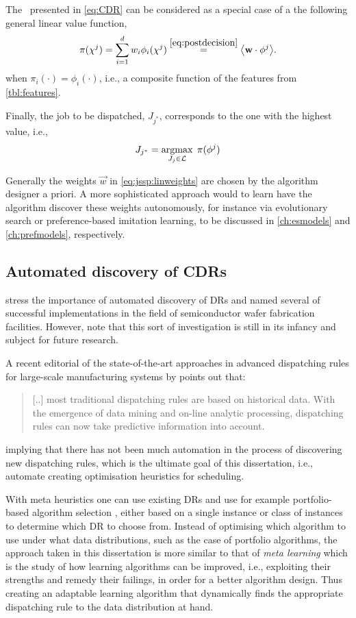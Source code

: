 The \cdr\ presented in \cref{eq:CDR} can be considered as a special case of a 
the following general linear value function,
\begin{equation}\label{eq:jssp:linweights}
    \pi(\vchi^j)=\sum_{i=1}^d w_i \phi_i(\vchi^j) 
    \stackrel{\eqref{eq:postdecision}}{=}
    \inner{\vec{w}}{\vphi^j}.
\end{equation}
when $\pi_i(\cdot)=\phi_i(\cdot)$, i.e., a composite function of the features 
from \cref{tbl:features}. 

Finally, the job to be dispatched, $J_{j^*}$, corresponds to the one with the 
highest value, i.e.,
\begin{equation}\label{eq:lin}
    J_{j^*}=\argmax_{J_j\in \mathcal{L}}\; \pi(\vphi^j)
\end{equation}

Generally the weights $\vec{w}$ in \cref{eq:jssp:linweights} are chosen by the 
algorithm designer a priori. 
A more sophisticated approach would to learn have the algorithm discover these 
weights autonomously, for instance via evolutionary search or preference-based 
imitation learning, to be discussed in \cref{ch:esmodels} and 
\cref{ch:prefmodels}, respectively.

\subsection*{Automated discovery of CDRs}
\citet{Monch13} stress the importance of automated discovery of DRs and named several of successful implementations in the field of semiconductor wafer fabrication facilities. 
However, \citeauthor{Monch13} note that this sort of investigation is still in its infancy and subject for future research.

A recent editorial of the state-of-the-art approaches in advanced dispatching rules for large-scale manufacturing systems by \citet{Chen13} points out that:
\begin{quote}
	[..] most traditional dispatching rules are based on historical data. With the emergence of data mining and on-line analytic processing, dispatching rules can now take predictive information into account.
\end{quote}
implying that there has not been much automation in the process of discovering new dispatching rules, which is the ultimate goal of this dissertation, i.e., automate creating optimisation heuristics for scheduling. 

With meta heuristics one can use existing DRs and use for example 
{portfolio-based algorithm selection} \citep{Rice76,Gomes01}, either based 
on a single instance or class of instances \citep{Xu07} to determine which DR 
to choose from. 
Instead of optimising which algorithm to use under what data distributions, 
such as the case of portfolio algorithms, the approach taken in this 
dissertation is more similar to that of \emph{meta learning} \citep{Vilalta02} 
which is the study of how learning algorithms can be improved, i.e., exploiting 
their strengths and remedy their failings, in order for a better algorithm 
design. Thus creating an adaptable learning algorithm that dynamically finds 
the appropriate dispatching rule  to the data distribution at hand. 

